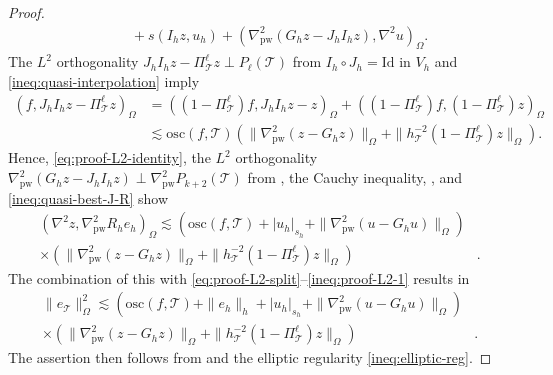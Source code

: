 \documentclass[a4paper]{amsart}
\numberwithin{equation}{section}
\def\T{\mathcal{T}}
\def\pw{\mathrm{pw}}
\theoremstyle{definition}
\theoremstyle{remark}
\numberwithin{theorem}{section}
\numberwithin{equation}{section}
\numberwithin{table}{section}
\numberwithin{figure}{section}
\begin{document}
\begin{proof}
\begin{align}
    	&\qquad + s(I_h z, u_h) + (\nabla_\pw^2(G_h z - J_h I_h z), \nabla^2 u)_\Omega.
    \end{align}
    The $L^2$ orthogonality $J_h I_h z - \Pi_\T^\ell z \perp P_{\ell}(\T)$ from $I_h \circ J_h = \mathrm{Id}$ in $V_h$ and \eqref{ineq:quasi-interpolation} imply
    \begin{align*}
    	(f, J_h I_h z - \Pi_\T^\ell z)_\Omega &= ((1 - \Pi_\T^\ell)f, J_h I_h z-z)_\Omega + ((1 - \Pi_\T^\ell)f, (1 - \Pi_\T^\ell) z)_\Omega\\
    	&\lesssim \mathrm{osc}(f,\T)(\|\nabla_\pw^2(z - G_h z)\|_\Omega + \|h_\T^{-2}(1-\Pi_\T^\ell)z\|_\Omega).
    \end{align*}
    Hence, \eqref{eq:proof-L2-identity}, the $L^2$ orthogonality $\nabla_\pw^2(G_h z - J_h I_h z) \perp \nabla_\pw^2 P_{k+2}(\T)$ from , the Cauchy inequality, , and \eqref{ineq:quasi-best-J-R} show
    \begin{align*}
    	(\nabla^2 z,\nabla^2_\pw R_h e_h)_{\Omega} \lesssim (\mathrm{osc}(f,\T) + |u_h|_{s_h} + \|\nabla_\pw^2(u - G_h u)\|_\Omega)&\\
        \times (\|\nabla_\pw^2(z - G_h z)\|_\Omega + \|h_\T^{-2}(1-\Pi_\T^\ell)z\|_\Omega)&.
    \end{align*}
    The combination of this with \eqref{eq:proof-L2-split}--\eqref{ineq:proof-L2-1} results in
    \begin{align*}
    	\|e_\T\|^2_\Omega \lesssim (\mathrm{osc}(f,\T) + \|e_h\|_h + |u_h|_{s_h} + \|\nabla_\pw^2(u - G_h u)\|_\Omega)&\\
        \times (\|\nabla_\pw^2(z - G_h z)\|_\Omega + \|h_\T^{-2}(1-\Pi_\T^\ell)z\|_\Omega)&.
    \end{align*}
    The assertion then follows from  and the elliptic regularity \eqref{ineq:elliptic-reg}.
\end{proof}
\end{document}
